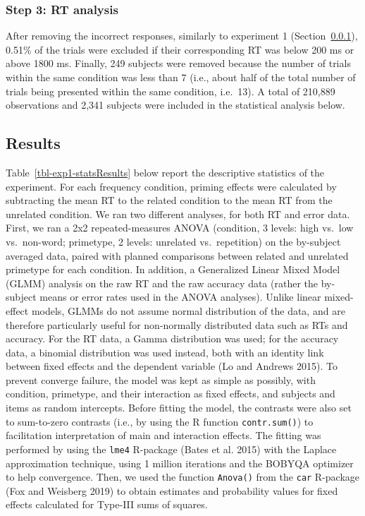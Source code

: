 \documentclass[
]{interact}
\begin{document}
\subsubsection{Step 3: RT analysis}\label{sec-exp1-analysis-RT}

After removing the incorrect responses, similarly to experiment 1
(Section~\ref{sec-exp1-analysis-RT}), 0.51\% of the trials were excluded
if their corresponding RT was below 200 ms or above 1800 ms. Finally,
249 subjects were removed because the number of trials within the same
condition was less than 7 (i.e., about half of the total number of
trials being presented within the same condition, i.e.~13). A total of
210,889 observations and 2,341 subjects were included in the statistical
analysis below.

\subsection{Results}\label{sec-exp1-results}

Table~\ref{tbl-exp1-statsResults} below report the descriptive
statistics of the experiment. For each frequency condition, priming
effects were calculated by subtracting the mean RT to the related
condition to the mean RT from the unrelated condition. We ran two
different analyses, for both RT and error data. First, we ran a 2x2
repeated-measures ANOVA (condition, 3 levels: high vs.~low vs.~non-word;
primetype, 2 levels: unrelated vs.~repetition) on the by-subject
averaged data, paired with planned comparisons between related and
unrelated primetype for each condition. In addition, a Generalized
Linear Mixed Model (GLMM) analysis on the raw RT and the raw accuracy
data (rather the by-subject means or error rates used in the ANOVA
analyses). Unlike linear mixed-effect models, GLMMs do not assume normal
distribution of the data, and are therefore particularly useful for
non-normally distributed data such as RTs and accuracy. For the RT data,
a Gamma distribution was used; for the accuracy data, a binomial
distribution was used instead, both with an identity link between fixed
effects and the dependent variable (Lo and Andrews 2015). To prevent
converge failure, the model was kept as simple as possibly, with
condition, primetype, and their interaction as fixed effects, and
subjects and items as random intercepts. Before fitting the model, the
contrasts were also set to sum-to-zero contrasts (i.e., by using the R
function \texttt{contr.sum()}) to facilitation interpretation of main
and interaction effects. The fitting was performed by using the
\texttt{lme4} R-package (Bates et al. 2015) with the Laplace
approximation technique, using 1 million iterations and the BOBYQA
optimizer to help convergence. Then, we used the function
\texttt{Anova()} from the \texttt{car} R-package (Fox and Weisberg 2019)
to obtain estimates and probability values for fixed effects calculated
for Type-III sums of squares.
\end{document}
